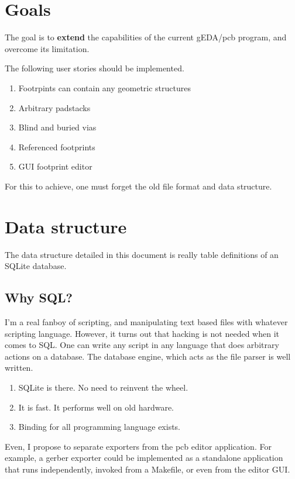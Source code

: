 \documentclass[12pt]{article}
\begin{document}
\section{Goals}\label{goals}

The goal is to \textbf{extend} the capabilities of the current gEDA/pcb
program, and overcome its limitation.

The following user stories should be implemented.

\begin{enumerate}
\item
  Footrpints can contain any geometric structures
\item
  Arbitrary padstacks
\item
  Blind and buried vias
\item
  Referenced footprints
\item GUI footprint editor

\end{enumerate}

For this to achieve, one must forget the old file format and data
structure.

\section{Data structure}\label{data-structure}

The data structure detailed in this document is really table definitions of an
SQLite database.

\subsection{Why SQL?}\label{why-sql}

I'm a real fanboy of scripting, and manipulating text based files with
whatever scripting language. However, it turns out that hacking is not needed
when it comes to SQL. One can write any script in any language that does
arbitrary actions on a database. The database engine, which acts as the file
parser is well written.

\begin{enumerate}
\item
  SQLite is there. No need to reinvent the wheel.
\item
  It is fast. It performs well on old hardware.
\item
  Binding for all programming language exists.
\end{enumerate}

Even, I propose to separate exporters from the pcb editor application. For
example, a gerber exporter could be implemented as a standalone application
that runs independently, invoked from a Makefile, or even from the editor GUI.
\end{document}
